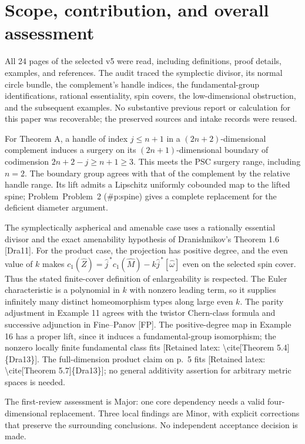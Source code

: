 \documentclass[10pt]{article}
\begin{document}
\section*{Scope, contribution, and overall assessment}
All 24 pages of the selected v5 were read, including definitions, proof details, examples, and references. The audit traced the symplectic divisor, its normal circle bundle, the complement’s handle indices, the fundamental-group identifications, rational essentiality, spin covers, the low-dimensional obstruction, and the subsequent examples. No substantive previous report or calculation for this paper was recoverable; the preserved sources and intake records were reused.\par
For Theorem A, a handle of index \(j\le n+1\) in a \((2n+2)\)-dimensional complement induces a surgery on its \((2n+1)\)-dimensional boundary of codimension \(2n+2-j\ge n+1\ge3\). This meets the PSC surgery range, including \(n=2\). The boundary group agrees with that of the complement by the relative handle range. Its lift admits a Lipschitz uniformly cobounded map to the lifted spine; Problem Problem 2 (\#p:spine) gives a complete replacement for the deficient diameter argument.\par
The symplectically aspherical and amenable case uses a rationally essential divisor and the exact amenability hypothesis of Dranishnikov’s Theorem 1.6 [Dra11]. For the product case, the projection has positive degree, and the even value of \(k\) makes \(c_1(\widehat Z)=\widehat j^{\,*}c_1(\widehat M)-k\widehat j^{\,*}[\widehat\omega]\) even on the selected spin cover. Thus the stated finite-cover definition of enlargeability is respected. The Euler characteristic is a polynomial in \(k\) with nonzero leading term, so it supplies infinitely many distinct homeomorphism types along large even \(k\). The parity adjustment in Example 11 agrees with the twistor Chern-class formula and successive adjunction in Fine–Panov [FP]. The positive-degree map in Example 16 has a proper lift, since it induces a fundamental-group isomorphism; the nonzero locally finite fundamental class fits [Retained latex: \textbackslash{}cite[Theorem 5.4]\{Dra13\}]. The full-dimension product claim on p. 5 fits [Retained latex: \textbackslash{}cite[Theorem 5.7]\{Dra13\}]; no general additivity assertion for arbitrary metric spaces is needed.\par
The first-review assessment is Major: one core dependency needs a valid four-dimensional replacement. Three local findings are Minor, with explicit corrections that preserve the surrounding conclusions. No independent acceptance decision is made.\par
\end{document}
